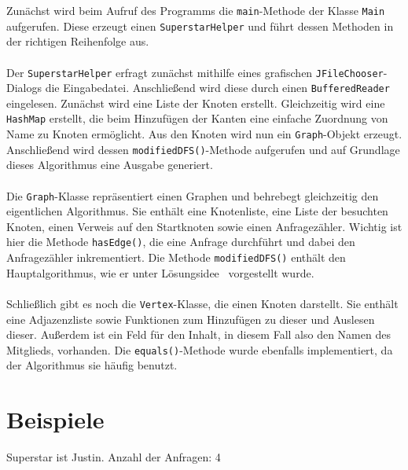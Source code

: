 \documentclass[a4paper, notitlepage, 12pt]{scrartcl}
\begin{document}
Zunächst wird beim Aufruf des Programms die \texttt{main}-Methode der Klasse \texttt{Main} aufgerufen. Diese erzeugt einen \texttt{SuperstarHelper} und führt dessen Methoden in der richtigen Reihenfolge aus. \\ \\
Der \texttt{SuperstarHelper} erfragt zunächst mithilfe eines grafischen \texttt{JFileChooser}-Dialogs die Eingabedatei. Anschließend wird diese durch einen \texttt{BufferedReader} eingelesen. Zunächst wird eine Liste der Knoten erstellt. Gleichzeitig wird eine \texttt{HashMap} erstellt, die beim Hinzufügen der Kanten eine einfache Zuordnung von Name zu Knoten ermöglicht. Aus den Knoten wird nun ein \texttt{Graph}-Objekt erzeugt. Anschließend wird dessen \texttt{modifiedDFS()}-Methode aufgerufen und auf Grundlage dieses Algorithmus eine Ausgabe generiert. \\ \\
Die \texttt{Graph}-Klasse repräsentiert einen Graphen und behrebegt gleichzeitig den eigentlichen Algorithmus. Sie enthält eine Knotenliste, eine Liste der besuchten Knoten, einen Verweis auf den Startknoten sowie einen Anfragezähler. Wichtig ist hier die Methode \texttt{hasEdge()}, die eine Anfrage durchführt und dabei den Anfragezähler inkrementiert. Die Methode \texttt{modifiedDFS()} enthält den Hauptalgorithmus, wie er unter \glqq Lösungsidee \grqq ~vorgestellt wurde. \\ \\
Schließlich gibt es noch die \texttt{Vertex}-Klasse, die einen Knoten darstellt. Sie enthält eine Adjazenzliste sowie Funktionen zum Hinzufügen zu dieser und Auslesen dieser. Außerdem ist ein Feld für den Inhalt, in diesem Fall also den Namen des Mitglieds, vorhanden. Die \texttt{equals()}-Methode wurde ebenfalls implementiert, da der Algorithmus sie häufig benutzt.

\section{Beispiele}
 \begin{MyVerbatim}
Superstar ist Justin.
Anzahl der Anfragen: 4
 \end{MyVerbatim}
\end{document}
